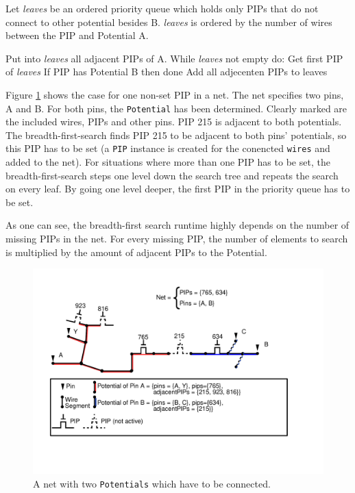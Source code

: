 Let \textit{leaves} be an ordered priority queue which holds only PIPs that do not connect to other potential besides B. \textit{leaves} is ordered by the number of wires between the PIP and Potential A.

Put into \textit{leaves} all adjacent PIPs of A.
While \textit{leaves} not empty do:
	Get first PIP of \textit{leaves}
	If PIP has Potential B then done
	Add all adjecenten PIPs to leaves

Figure \ref{fig:brokenpotentials} shows the case for one non-set PIP in a net. The net specifies two pins, A and B. For both pins, the \texttt{Potential} has been determined. Clearly marked are the included wires, PIPs and other pins. PIP 215 is adjacent to both potentials. The breadth-first-search finds PIP 215 to be adjacent to both pins' potentials, so this PIP has to be set (a \texttt{PIP} instance is created for the conencted \texttt{wires} and added to the net). For situations where more than one PIP has to be set, the breadth-first-search steps one level down the search tree and repeats the search on every leaf. By going one level deeper, the first PIP in the priority queue has to be set.

As one can see, the breadth-first search runtime highly depends on the number of missing PIPs in the net. For every missing PIP, the number of elements to search is multiplied by the amount of adjacent PIPs to the Potential.

\begin{figure}
\includegraphics[scale=1]{images/brokenpotentials.pdf}
\caption{A net with two \texttt{Potentials} which have to be connected.}
\label{fig:brokenpotentials}
\end{figure}

